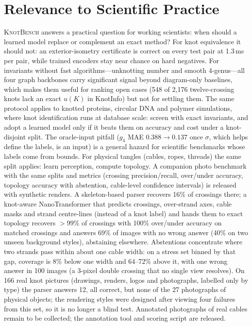 \documentclass{article}
\begin{document}
\section{Relevance to Scientific Practice}\label{sec:impact}
\textsc{KnotBench} answers a practical question for working scientists: when
should a learned model replace or complement an exact method? For knot
equivalence it should not: an exterior-isometry certificate is correct on every
test pair at 1.3\,ms per pair, while trained encoders stay near chance on hard
negatives. For invariants without fast algorithms---unknotting number and
smooth 4-genus---all four graph backbones carry significant signal beyond
diagram-only baselines, which makes them useful for ranking open cases (548 of
2{,}176 twelve-crossing knots lack an exact $u(K)$ in KnotInfo) but not for
settling them. The same protocol applies to knotted proteins, circular DNA and
polymer simulations, where knot identification runs at database scale: screen
with exact invariants, and adopt a learned model only if it beats them on accuracy
and cost under a knot-disjoint split. The oracle-input pitfall
($g_4$ MAE $0.388\to0.137$ once $\sigma$, which helps define the labels, is an input)
is a general hazard for scientific benchmarks whose labels come from bounds. For physical tangles (cables, ropes, threads) the same split applies:
learn perception, compute topology. A companion photo benchmark with the
same splits and metrics (crossing precision/recall, over/under accuracy, topology
accuracy with abstention, cable-level confidence intervals) is released with
synthetic renders. A skeleton-based parser recovers 16\% of crossings there; a
knot-aware NanoTransformer that predicts crossings, over-strand axes, cable masks and
strand centre-lines (instead of a knot label) and hands them to exact topology
recovers $>99\%$ of crossings with 100\% over/under accuracy on matched crossings
and answers 69\% of images with no wrong answer (40\% on two unseen background
styles), abstaining elsewhere. Abstentions concentrate where two strands pass
within about one cable width: on a stress set binned by that gap, coverage is
8\% below one width and 64--72\% above it, with one wrong answer in 100 images (a
3-pixel double crossing that no single view resolves). On 166 real knot pictures
(drawings, renders, logos and photographs, labelled only by type) the parser
answers 12, all correct, but none of the 27 photographs of physical objects; the
rendering styles were designed after viewing four failures from this set, so it is
no longer a blind test. Annotated photographs of real cables remain to be collected;
the annotation tool and scoring script are released.
\end{document}
